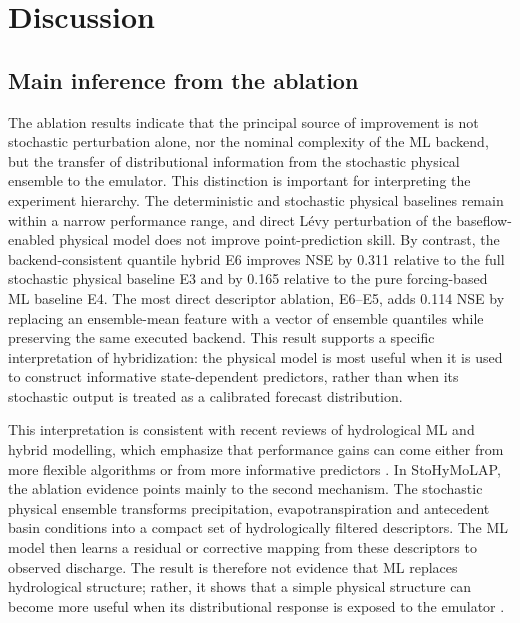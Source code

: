 \section{Discussion}\label{sec:discussion}

\subsection{Main inference from the ablation}
\label{subsec:discussion-main-inference}

The ablation results indicate that the principal source of improvement
is not stochastic perturbation alone, nor the nominal complexity of the
ML backend, but the transfer of distributional information from the
stochastic physical ensemble to the emulator. This distinction is
important for interpreting the experiment hierarchy. The deterministic
and stochastic physical baselines remain within a narrow performance
range, and direct L\'{e}vy perturbation of the baseflow-enabled physical
model does not improve point-prediction skill. By contrast, the
backend-consistent quantile hybrid E6 improves NSE by 0.311 relative to
the full stochastic physical baseline E3 and by 0.165 relative to the
pure forcing-based ML baseline E4. The most direct descriptor ablation,
E6--E5, adds 0.114 NSE by replacing an ensemble-mean feature with a
vector of ensemble quantiles while preserving the same executed
backend. This result supports a specific interpretation of hybridization:
the physical model is most useful when it is used to construct
informative state-dependent predictors, rather than when its stochastic
output is treated as a calibrated forecast distribution.

This interpretation is consistent with recent reviews of hydrological
ML and hybrid modelling, which emphasize that performance gains can
come either from more flexible algorithms or from more informative
predictors \citep{papacharalampous2022review,zhong2023developing}. In
StoHyMoLAP, the ablation evidence points mainly to the second mechanism.
The stochastic physical ensemble transforms precipitation,
evapotranspiration and antecedent basin conditions into a compact set of
hydrologically filtered descriptors. The ML model then learns a residual
or corrective mapping from these descriptors to observed discharge. The
result is therefore not evidence that ML replaces hydrological
structure; rather, it shows that a simple physical structure can become
more useful when its distributional response is exposed to the emulator
\citep{mekonnen2015hybrid,houenafa2025hybridization}.

